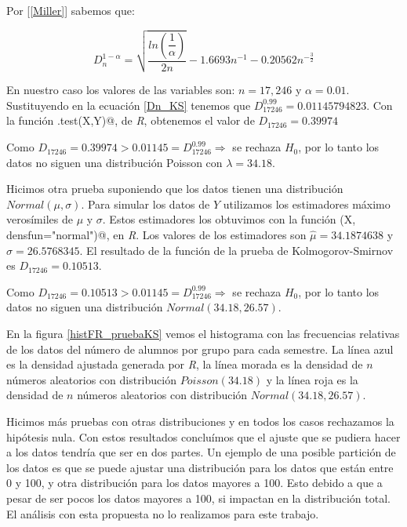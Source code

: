 Por [\ref{Miller}] sabemos que:

\begin{equation}\label{Dn_KS}
D_{n}^{1-\alpha} = \sqrt{\dfrac{ln \left(\dfrac{1}{\alpha}\right)}{2n}} - 1.6693 n^{-1} - 0.20562 n^{-\frac{3}{2}}
\end{equation}

En nuestro caso los valores de las variables son: $n = 17,246$ y $\alpha = 0.01$. Sustituyendo en la ecuación \ref{Dn_KS} tenemos que $D_{17246}^{0.99} = 0.01145794823$. Con la función \verb@ks.test(X,Y)@, de \textit{R}, obtenemos el valor de $D_{17246} = 0.39974$

Como $D_{17246} = 0.39974 > 0.01145 = D_{17246}^{0.99} \Rightarrow $ se rechaza $H_{0}$, por lo tanto los datos no siguen una distribución Poisson con $\lambda = 34.18$.


Hicimos otra prueba suponiendo que los datos tienen una distribución $Normal(\mu,\sigma)$. Para simular los datos de $Y$ utilizamos los estimadores máximo verosímiles de $\mu$ y $\sigma$. Estos estimadores los obtuvimos con la función \verb@fitdistr(X, densfun="normal")@, en \textit{R}. Los valores de los estimadores son $\hat{\mu} = 34.1874638$ y $\hat{\sigma} = 26.5768345$. El resultado de la función de la prueba de Kolmogorov-Smirnov es $D_{17246} = 0.10513$.

Como $D_{17246} = 0.10513 > 0.01145 = D_{17246}^{0.99} \Rightarrow $ se rechaza $H_{0}$, por lo tanto los datos no siguen una distribución $Normal(34.18,26.57)$.

En la figura \ref{histFR_pruebaKS} vemos el histograma con las frecuencias relativas de los datos del número de alumnos por grupo para cada semestre. La línea azul es la densidad ajustada generada por \textit{R}, la línea morada es la densidad de $n$ números aleatorios con distribución  $Poisson(34.18)$ y la línea roja es la densidad de $n$ números aleatorios con distribución  $Normal(34.18,26.57)$.

Hicimos más pruebas con otras distribuciones y en todos los casos rechazamos la hipótesis nula. Con estos resultados concluímos que el ajuste que se pudiera hacer a los datos tendría que ser en dos partes. Un ejemplo de una posible partición de los datos es que se puede ajustar una distribución para los datos que están entre 0 y 100, y otra distribución para los datos mayores a 100. Esto debido a que a pesar de ser pocos los datos mayores a 100, si impactan en la distribución total. El análisis con esta propuesta no lo realizamos para este trabajo.

